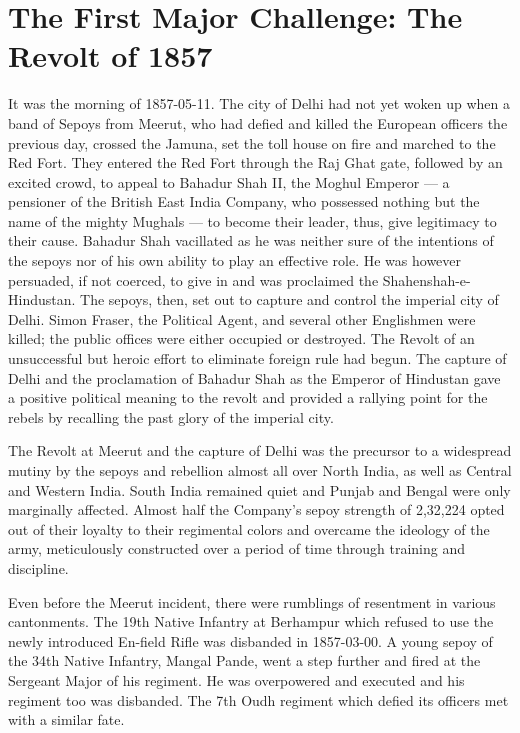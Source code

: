 
\chapter{The First Major Challenge: The Revolt of 1857}

It was the morning of 1857-05-11. The city of Delhi had not yet woken up when a band of Sepoys from Meerut, who had defied and killed the European officers the previous day, crossed the Jamuna, set the toll house on fire and marched to the Red Fort. They entered the Red Fort through the Raj Ghat gate, followed by an excited crowd, to appeal to Bahadur Shah II, the Moghul Emperor --- a pensioner of the British East India Company, who possessed nothing but the name of the mighty Mughals --- to become their leader, thus, give legitimacy to their cause. Bahadur Shah vacillated as he was neither sure of the intentions of the sepoys nor of his own ability to play an effective role. He was however persuaded, if not coerced, to give in and was proclaimed the Shahenshah-e-Hindustan. The sepoys, then, set out to capture and control the imperial city of Delhi. Simon Fraser, the Political Agent, and several other Englishmen were killed; the public offices were either occupied or destroyed. The Revolt of an unsuccessful but heroic effort to eliminate foreign rule had begun. The capture of Delhi and the proclamation of Bahadur Shah as the Emperor of Hindustan gave a positive political meaning to the revolt and provided a rallying point for the rebels by recalling the past glory of the imperial city.

The Revolt at Meerut and the capture of Delhi was the precursor to a widespread mutiny by the sepoys and rebellion almost all over North India, as well as Central and Western India. South India remained quiet and Punjab and Bengal were only marginally affected. Almost half the Company's sepoy strength of 2,32,224 opted out of their loyalty to their regimental colors and overcame the ideology of the army, meticulously constructed over a period of time through training and discipline.

Even before the Meerut incident, there were rumblings of resentment in various cantonments. The 19th Native Infantry at Berhampur which refused to use the newly introduced En-field Rifle was disbanded in 1857-03-00. A young sepoy of the 34th Native Infantry, Mangal Pande, went a step further and fired at the Sergeant Major of his regiment. He was overpowered and executed and his regiment too was disbanded. The 7th Oudh regiment which defied its officers met with a similar fate.

